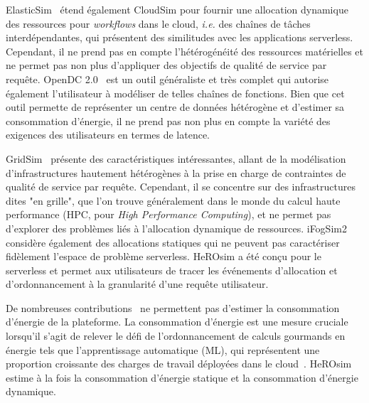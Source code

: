 ElasticSim~\cite{cai_elasticsim_2017} étend également CloudSim pour fournir une allocation dynamique des ressources pour \textit{workflows} dans le cloud, \textit{i.e.} des chaînes de tâches interdépendantes, qui présentent des similitudes avec les applications serverless. Cependant, il ne prend pas en compte l'hétérogénéité des ressources matérielles et ne permet pas non plus d'appliquer des objectifs de qualité de service par requête. OpenDC 2.0~\cite{mastenbroekOpenDCConvenientModeling2021} est un outil généraliste et très complet qui autorise également l'utilisateur à modéliser de telles chaînes de fonctions. Bien que cet outil permette de représenter un centre de données hétérogène et d'estimer sa consommation d'énergie, il ne prend pas non plus en compte la variété des exigences des utilisateurs en termes de latence.

GridSim~\cite{buyyaGridSimToolkitModeling2002} présente des caractéristiques intéressantes, allant de la modélisation d'infrastructures hautement hétérogènes à la prise en charge de contraintes de qualité de service par requête. Cependant, il se concentre sur des infrastructures dites "en grille", que l'on trouve généralement dans le monde du calcul haute performance (\gls{HPC}, pour \textit{High Performance Computing}), et ne permet pas d'explorer des problèmes liés à l'allocation dynamique de ressources. iFogSim2~\cite{mahmudIFogSim2ExtendedIFogSim2021} considère également des allocations statiques qui ne peuvent pas caractériser fidèlement l'espace de problème serverless.
HeROsim a été conçu pour le serverless et permet aux utilisateurs de tracer les événements d'allocation et d'ordonnancement à la granularité d'une requête utilisateur.

De nombreuses contributions~\cite{jeonCloudSimExtensionSimulatingDistributed2019, cai_elasticsim_2017, buyyaGridSimToolkitModeling2002, nunez_icancloud_2012} ne permettent pas d'estimer la consommation d'énergie de la plateforme. La consommation d'énergie est une mesure cruciale lorsqu'il s'agit de relever le défi de l'ordonnancement de calculs gourmands en énergie tels que l'apprentissage automatique (\gls{ML}), qui représentent une proportion croissante des charges de travail déployées dans le cloud~\cite{masanetRecalibratingGlobalData2020}.
HeROsim estime à la fois la consommation d'énergie statique et la consommation d'énergie dynamique.

